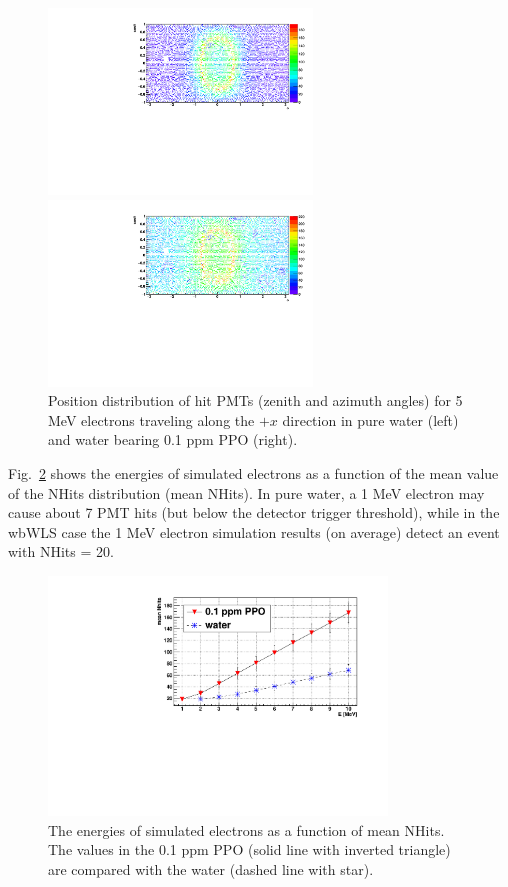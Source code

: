 \begin{figure}[htbp]
	\centering
	\begin{minipage}[t]{0.48\textwidth}
		\centering
		\includegraphics[width=7cm]{PMT_5MeVElectronWater.pdf}
	\end{minipage}
	\begin{minipage}[t]{0.48\textwidth}
		\centering
		\includegraphics[width=7cm]{PMT_5MeVElectron0p1ppmPPO.pdf}
	\end{minipage}
	\caption[Position distribution of hit PMTs (zenith and azimuth angles).]{Position distribution of hit PMTs (zenith and azimuth angles) for 5 MeV electrons traveling along the $+x$ direction in pure water (left) and water bearing 0.1 ppm PPO (right).\label{pmt_wls}}	
\end{figure}

Fig.~\ref{nhit_wls} shows the energies of simulated electrons as a function of the mean value of the NHits distribution (mean NHits). In pure water, a 1 MeV electron may cause about 7 PMT hits (but below the detector trigger threshold), while in the wbWLS case the 1 MeV electron simulation results (on average) detect an event with NHits = 20.

\begin{figure}[htbp]
	\centering	
	\includegraphics[width=9cm]{nhits_wls.pdf}
	\caption[The energies of simulated electrons as a function of mean NHits.]{The energies of simulated electrons as a function of mean NHits. The values in the 0.1 ppm PPO (solid line with inverted triangle) are compared with the water (dashed line with star).	\label{nhit_wls}}
\end{figure}

